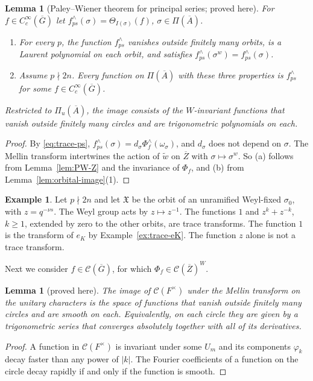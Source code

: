 \documentclass[12pt,letterpaper]{article}
\numberwithin{equation}{section}
\newtheorem{lemma}[theorem]{Lemma}
\theoremstyle{definition}
\newtheorem{xexample}[theorem]{Example}
\newcommand{\proved}{proved here}
\newcommand{\bG}{\overline{G}}
\newcommand{\bA}{\overline{A}}
\newcommand{\bZ}{\overline{Z}}
\newcommand{\wt}{\tilde w}
\newcommand{\calC}{\mathcal C}
\newcommand{\fX}{\mathfrak X}
\begin{document}
\begin{lemma}[Paley--Wiener theorem for principal series; \proved]\label{lem:PWps}
For $f\in C_c^\infty(\bG)$ let $f^\wedge_{ps}(\sigma)=\Theta_{I(\sigma)}(f)$, $\sigma\in\Pi(\bA)$.
\begin{enumerate}[label=(\alph*),leftmargin=*,itemsep=1pt]
\item For every $p$, the function $f^\wedge_{ps}$ vanishes outside finitely many orbits, is a
Laurent polynomial on each orbit, and satisfies $f^\wedge_{ps}(\sigma^w)=f^\wedge_{ps}(\sigma)$.
\item Assume $p\nmid2n$.  Every function on $\Pi(\bA)$ with these three properties is
$f^\wedge_{ps}$ for some $f\in C_c^\infty(\bG)$.
\end{enumerate}
Restricted to $\Pi_u(\bA)$, the image consists of the $W$-invariant functions that vanish
outside finitely many circles and are trigonometric polynomials on each.
\end{lemma}
\begin{proof}
By \eqref{eq:trace-ps}, $f^\wedge_{ps}(\sigma)=d_\sigma\Phi_f^\wedge(\omega_\sigma)$, and
$d_\sigma$ does not depend on $\sigma$.  The Mellin transform intertwines the action of
$\wt$ on $\bZ$ with $\sigma\mapsto\sigma^w$.  So (a) follows from Lemma~\ref{lem:PW-Z} and the
invariance of $\Phi_f$, and (b) from Lemma~\ref{lem:orbital-image}(1).
\end{proof}

\begin{xexample}\label{ex:PWps}
Let $p\nmid 2n$ and let $\fX$ be the orbit of an unramified Weyl-fixed $\sigma_0$, with
$z=q^{-\nu s}$.  The Weyl group acts by $z\mapsto z^{-1}$.  The functions $1$ and
$z^k+z^{-k}$, $k\ge1$, extended by zero to the other orbits, are trace transforms.  The
function $1$ is the transform of $e_K$ by Example~\ref{ex:trace-eK}.  The function $z$
alone is not a trace transform.
\end{xexample}

Next we consider $f\in\calC(\bG)$, for which $\Phi_f\in\calC(\bZ)^W$.

\begin{lemma}[\proved]\label{lem:SPW-Fx}
The image of $\calC(F^\times)$ under the Mellin transform on the unitary characters is the
space of functions that vanish outside finitely many circles and are smooth on each.
Equivalently, on each circle they are given by a trigonometric series that converges
absolutely together with all of its derivatives.
\end{lemma}
\begin{proof}
A function in $\calC(F^\times)$ is invariant under some $U_m$ and its components
$\varphi_k$ decay faster than any power of $|k|$.  The Fourier coefficients of a function
on the circle decay rapidly if and only if the function is smooth.
\end{proof}
\end{document}
